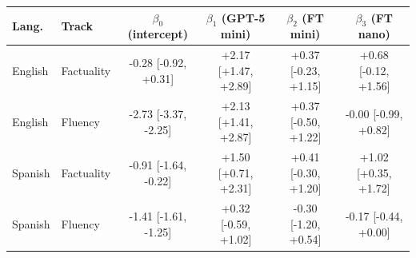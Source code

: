 \begin{tabular}{llcccc}
\hline
\textbf{Lang.} & \textbf{Track} & $\beta_0$ \textbf{(intercept)} & $\beta_1$ \textbf{(GPT-5 mini)} & $\beta_2$ \textbf{(FT mini)} & $\beta_3$ \textbf{(FT nano)} \\
\hline
English & Factuality & -0.28 [-0.92, +0.31] & +2.17 [+1.47, +2.89] & +0.37 [-0.23, +1.15] & +0.68 [-0.12, +1.56] \\
English & Fluency & -2.73 [-3.37, -2.25] & +2.13 [+1.41, +2.87] & +0.37 [-0.50, +1.22] & -0.00 [-0.99, +0.82] \\
Spanish & Factuality & -0.91 [-1.64, -0.22] & +1.50 [+0.71, +2.31] & +0.41 [-0.30, +1.20] & +1.02 [+0.35, +1.72] \\
Spanish & Fluency & -1.41 [-1.61, -1.25] & +0.32 [-0.59, +1.02] & -0.30 [-1.20, +0.54] & -0.17 [-0.44, +0.00] \\
\hline
\end{tabular}
